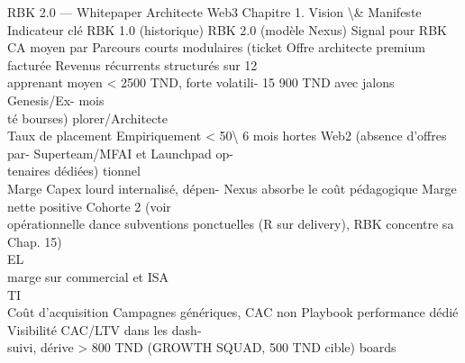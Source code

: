 RBK 2.0 — Whitepaper Architecte Web3                                                                      Chapitre 1. Vision \textbackslash{}& Manifeste\\
\vspace{0.5em}
\vspace{0.5em}
\vspace{0.5em}
Indicateur clé       RBK 1.0 (historique)                RBK 2.0 (modèle Nexus)              Signal pour RBK\\
CA moyen par         Parcours courts modulaires (ticket Offre architecte premium facturée Revenus récurrents structurés sur 12\\
apprenant            moyen \textless{} 2500 TND, forte volatili- 15 900 TND avec jalons Genesis/Ex- mois\\
té bourses)                        plorer/Architecte\\
Taux de placement Empiriquement \textless{} 50\textbackslash{}%
6 mois            hortes Web2 (absence d’offres par- Superteam/MFAI et Launchpad op-\\
tenaires dédiées)                  tionnel\\
Marge                Capex lourd internalisé, dépen- Nexus absorbe le coût pédagogique Marge nette positive Cohorte 2 (voir\\
opérationnelle       dance subventions ponctuelles   (R sur delivery), RBK concentre sa Chap. 15)\\
\vspace{0.5em}
\vspace{0.5em}
\vspace{0.5em}
\vspace{0.5em}
EL\\
marge sur commercial et ISA\\
\vspace{0.5em}
\vspace{0.5em}
\vspace{0.5em}
\vspace{0.5em}
TI\\
Coût d’acquisition   Campagnes génériques, CAC non Playbook    performance dédié Visibilité CAC/LTV dans les dash-\\
suivi, dérive \textgreater{} 800 TND       (GROWTH SQUAD, 500 TND cible) boards\\
\vspace{0.5em}
\vspace{0.5em}
